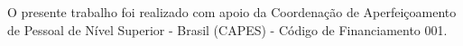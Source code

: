\begin{agradecimentos}

O presente trabalho foi realizado com apoio da Coordenação de Aperfeiçoamento de Pessoal de Nível Superior - Brasil (CAPES) - Código de Financiamento 001.

\end{agradecimentos}
